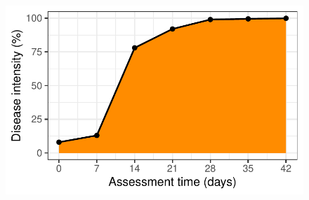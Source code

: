 \documentclass[
  letterpaper,
  DIV=11,
  numbers=noendperiod]{scrreprt}
\begin{document}
\begin{figure}[H]

{\centering \includegraphics{./temporal-dpc_files/figure-pdf/unnamed-chunk-8-1.pdf}

}

\end{figure}
\end{document}
